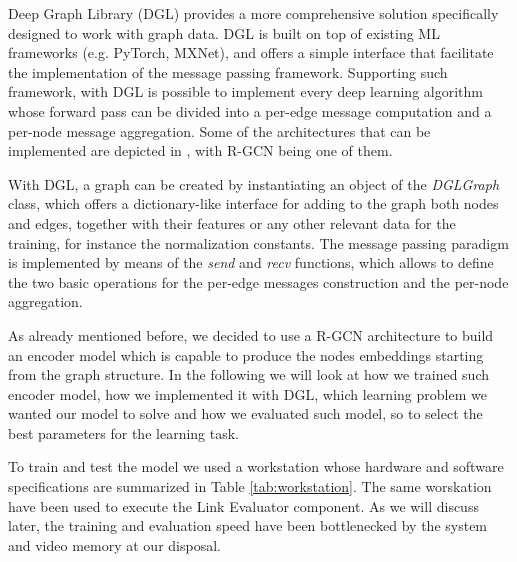 \documentclass[%
    corpo=13.5pt,
    twoside,
    oldstyle,
    tipotesi=magistrale,
    greek,
    evenboxes
]{toptesi}
\begin{document}
Deep Graph Library \cite{wang2019} (DGL) provides a more comprehensive
solution specifically designed to work with graph data. DGL is built on top of
existing ML frameworks (e.g. PyTorch, MXNet), and offers a simple
interface that facilitate the implementation of the message passing framework.
Supporting such framework, with DGL is possible to implement every deep learning
algorithm whose forward pass can be divided into a per-edge message computation
and a per-node message aggregation.
Some of the architectures that can be implemented
are depicted in \cite{gilmer2017}, with R-GCN being one of them.

With DGL, a graph can be created by instantiating an object of the
\emph{DGLGraph} class, which offers a dictionary-like interface for adding to
the graph both nodes and edges, together with their features or any other
relevant data for the training, for instance the normalization constants.
The message passing paradigm is implemented by means of the \emph{send} and
\emph{recv} functions, which allows to define the two basic operations for the
per-edge messages construction and the per-node aggregation.

As already mentioned before, we decided to use a R-GCN architecture to build
an encoder model which is capable to produce the nodes embeddings starting
from the graph structure.
In the following we will look at how we trained such encoder model, how we
implemented it with DGL, which learning problem we wanted our model to solve
and how we evaluated such model, so to select the best parameters for the
learning task.
\newline

To train and test the model we used a workstation whose hardware and software
specifications are summarized in Table \ref{tab:workstation}.
The same worskation have been used to execute the Link Evaluator component.
As we will discuss later, the training and evaluation speed have been
bottlenecked by the system and video memory at our disposal.
\end{document}
